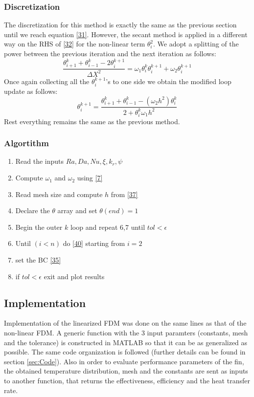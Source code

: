 \documentclass[12pt]{article}
\begin{document}
\subsubsection{Discretization}
The discretization for this method is exactly the same as the previous section until we reach equation \eqref{31}. However, the secant method is applied in a different way on the RHS of \eqref{32} for the non-linear term $\theta_i^2$. We adopt a splitting of the power between the previous iteration and the next iteration as follows:
\[
\frac{\theta_{i+1}^k+\theta_{i-1}^k-2\theta_i^{k+1}}{\Delta X^2} = \omega_1 \theta_i^k \theta_i^{k+1} + \omega_2 \theta_i^{k+1} \tag{39} \label{39}
\]
Once again collecting all the $\theta_i^{k+1}$'s to one side we obtain the modified loop update as follows: 
\[
\theta_i^{k+1}=\frac{\theta_{i+1}^k + \theta_{i-1}^k - (\omega_2 h^2)\theta_i^k}{2 + \theta_i^k \omega_1 h^2} \label{40} \tag{40}
\]
Rest everything remains the same as the previous method. 
\subsubsection{Algortithm}
\begin{enumerate}
    \item Read the inputs $Ra, Da, Nu, \xi, k_r, \psi$
    \item Compute $\omega_1$ and $\omega_2$ using \eqref{7}
    \item Read mesh size and compute $h$ from \eqref{37}
    \item Declare the $\theta$ array and set $\theta(end)=1$
    \item Begin the outer $k$ loop and repeat 6,7 until $tol<\epsilon$
    \item Until $(i<n)$ do \eqref{40} starting from $i=2$
    \item set the BC \eqref{35} 
    \item if $tol<\epsilon$ exit and plot results
\end{enumerate}
\subsection{Implementation}
Implementation of the linearized FDM was done on the same lines as that of the non-linear FDM. A generic function with the 3 input paramters (constants, mesh and the tolerance) is constructed in MATLAB so that it can be as generalized as possible. The same code organization is followed (further details can be found in section \ref{sec:Code}). Also in order to evaluate performance parameters of the fin, the obtained temperature distribution, mesh and the constants are sent as inputs to another function, that returns the effectiveness, efficiency and the heat transfer rate. 
\end{document}
